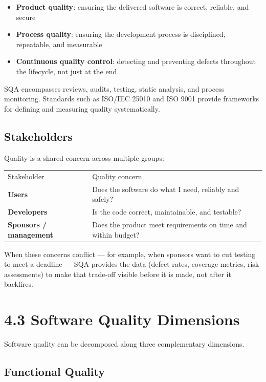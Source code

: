 \documentclass[11pt,a4paper]{book}
\begin{document}
\begin{itemize}
  \item \textbf{Product quality}: ensuring the delivered software is correct, reliable, and secure
  \item \textbf{Process quality}: ensuring the development process is disciplined, repeatable, and measurable
  \item \textbf{Continuous quality control}: detecting and preventing defects throughout the lifecycle, not just at the end
\end{itemize}

SQA encompasses reviews, audits, testing, static analysis, and process monitoring. Standards such as ISO/IEC 25010 and ISO 9001 provide frameworks for defining and measuring quality systematically.

\subsection{Stakeholders}

Quality is a shared concern across multiple groups:

\begin{tabular}{ll}
\hline
Stakeholder & Quality concern \\
\textbf{Users} & Does the software do what I need, reliably and safely? \\
\textbf{Developers} & Is the code correct, maintainable, and testable? \\
\textbf{Sponsors / management} & Does the product meet requirements on time and within budget? \\
\hline
\end{tabular}

When these concerns conflict --- for example, when sponsors want to cut testing to meet a deadline --- SQA provides the data (defect rates, coverage metrics, risk assessments) to make that trade-off visible before it is made, not after it backfires.

\medskip

\section{4.3 Software Quality Dimensions}

Software quality can be decomposed along three complementary dimensions.

\subsection{Functional Quality}
\end{document}
